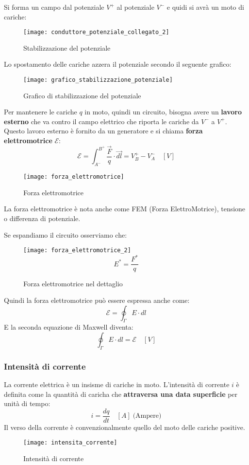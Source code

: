 \documentclass[a4paper]{article}
\begin{document}
Si forma un campo dal potenziale \( V^+ \) al potenziale \( V^- \)  e quidi si avrà
un moto di cariche:
\begin{figure}[H]
  \centering
  \texttt{[image: conduttore\_potenziale\_collegato\_2]}
  \caption{Stabilizzazione del potenziale}
\end{figure}
\noindent
Lo spostamento delle cariche azzera il potenziale secondo il seguente grafico:
\begin{figure}[H]
  \centering
  \texttt{[image: grafico\_stabilizzazione\_potenziale]}
  \caption{Grafico di stabilizzazione del potenziale}
\end{figure}
\noindent
Per mantenere le cariche \( q \) in moto, quindi un circuito, bisogna avere un \textbf{lavoro
esterno} che va contro il campo elettrico che riporta le cariche da \( V^- \) a
\( V^+ \). Questo lavoro esterno è fornito da un generatore e si chiama \textbf{forza
elettromotrice} \( \mathcal{E} \):
\[
  \mathcal{E} = \int_{A^-}^{B^+} \frac{\vec{F}}{q} \cdot \vec{dl}
  = V^+_B - V^-_A \quad \left[ V \right]
\] 
\begin{figure}[H]
  \centering
  \texttt{[image: forza\_elettromotrice]}
  \caption{Forza elettromotrice}
\end{figure}
\noindent
La forza elettromotrice è nota anche come FEM (Forza ElettroMotrice), tensione o
differenza di potenziale.

\vspace{1em}
\noindent
Se espandiamo il circuito osserviamo che:
\begin{figure}[H]
  \centering
  \texttt{[image: forza\_elettromotrice\_2]}
  \[
    E^* = \frac{F^*}{q}
  \] 
  \caption{Forza elettromotrice nel dettaglio}
\end{figure}
\noindent
Quindi la forza elettromotrice può essere espressa anche come:
\[
  \mathcal{E} = \oint_{\Gamma} E \cdot dl
\] 
E la seconda equazione di Maxwell diventa:
\[
  \oint_{\Gamma} E \cdot dl = \mathcal{E} \quad \left[ V \right]
\]

\subsubsection{Intensità di corrente}
La corrente elettrica è un insisme di cariche in moto. L'intensità di corrente \( i \) 
è definita come la quantità di caricha che \textbf{attraversa una data superficie} per
unità di tempo:
\[
  i = \frac{dq}{dt} \quad \left[ A \right] \; \text{(Ampere)}
\] 
Il verso della corrente è convenzionalmente quello del moto delle cariche positive.
\begin{figure}[H]
  \centering
  \texttt{[image: intensita\_corrente]}
  \caption{Intensità di corrente}
\end{figure}
\end{document}
